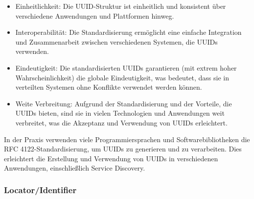 \begin{itemize}
\item Einheitlichkeit: Die UUID-Struktur ist einheitlich und konsistent über verschiedene Anwendungen und Plattformen hinweg.
\item Interoperabilität: Die Standardisierung ermöglicht eine einfache Integration und Zusammenarbeit zwischen verschiedenen Systemen, die UUIDs verwenden.
\item Eindeutigkeit: Die standardisierten UUIDs garantieren (mit extrem hoher Wahrscheinlichkeit) die globale Eindeutigkeit, was bedeutet, dass sie in verteilten Systemen ohne Konflikte verwendet werden können.
\item Weite Verbreitung: Aufgrund der Standardisierung und der Vorteile, die UUIDs bieten, sind sie in vielen Technologien und Anwendungen weit verbreitet, was die Akzeptanz und Verwendung von UUIDs erleichtert.
\end{itemize}
In der Praxis verwenden viele Programmiersprachen und Softwarebibliotheken die RFC 4122-Standardisierung, um UUIDs zu generieren und zu verarbeiten. Dies erleichtert die Erstellung und Verwendung von UUIDs in verschiedenen Anwendungen, einschließlich Service Discovery.


\subsubsection{Locator/Identifier}

